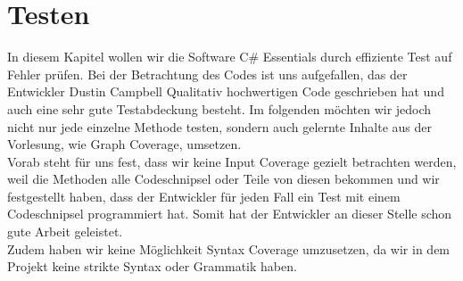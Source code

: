 %
\section{Testen}
In diesem Kapitel wollen wir die Software C\# Essentials durch effiziente Test auf Fehler prüfen. Bei der Betrachtung des Codes ist uns aufgefallen, das der Entwickler Dustin Campbell Qualitativ hochwertigen Code geschrieben hat und auch eine sehr gute Testabdeckung besteht. Im folgenden möchten wir jedoch nicht nur jede einzelne Methode testen, sondern auch gelernte Inhalte aus der Vorlesung, wie Graph Coverage, umsetzen.\\
Vorab steht für uns fest, dass wir keine Input Coverage gezielt betrachten werden, weil die Methoden alle Codeschnipsel oder Teile von diesen bekommen und wir festgestellt haben, dass der Entwickler für jeden Fall ein Test mit einem Codeschnipsel programmiert hat. Somit hat der Entwickler an dieser Stelle schon gute Arbeit geleistet.\\
Zudem haben wir keine Möglichkeit Syntax Coverage umzusetzen, da wir in dem Projekt keine strikte Syntax oder Grammatik haben.

